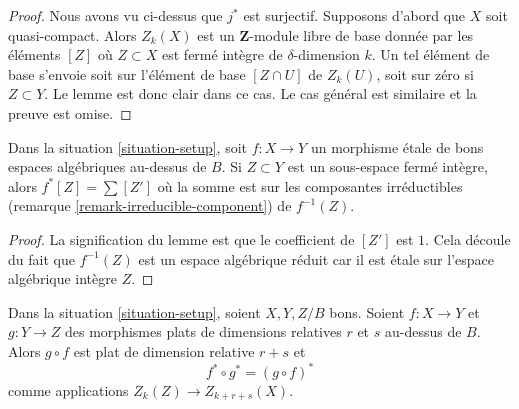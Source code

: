 \begin{proof}
Nous avons vu ci-dessus que $j^*$ est surjectif. Supposons d'abord que $X$
soit quasi-compact. Alors $Z_k(X)$ est un $\mathbf{Z}$-module libre de base
donnée par les éléments $[Z]$ où $Z \subset X$ est fermé intègre de
$\delta$-dimension $k$. Un tel élément de base s'envoie soit sur l'élément de
base $[Z \cap U]$ de $Z_k(U)$, soit sur zéro si $Z \subset Y$. Le lemme est donc
clair dans ce cas. Le cas général est similaire et la preuve est omise.
\end{proof}

\begin{lemma}
\label{lemma-etale-pullback}
Dans la situation \ref{situation-setup}, soit $f : X \to Y$ un morphisme
\'etale de bons espaces algébriques au-dessus de $B$. Si $Z \subset Y$ est un
sous-espace fermé intègre, alors $f^*[Z] = \sum [Z']$ où la somme est sur les
composantes irréductibles (remarque \ref{remark-irreducible-component}) de
$f^{-1}(Z)$.
\end{lemma}

\begin{proof}
La signification du lemme est que le coefficient de $[Z']$ est $1$. Cela
découle du fait que $f^{-1}(Z)$ est un espace algébrique réduit car il est
\'etale sur l'espace algébrique intègre $Z$.
\end{proof}

\begin{lemma}
\label{lemma-compose-flat-pullback}
Dans la situation \ref{situation-setup}, soient $X, Y, Z/B$ bons. Soient $f
: X \to Y$ et $g : Y \to Z$ des morphismes plats de dimensions relatives $r$
et $s$ au-dessus de $B$. Alors $g \circ f$ est plat de dimension relative $r + s$ et
$$
f^* \circ g^* = (g \circ f)^*
$$
comme applications $Z_k(Z) \to Z_{k + r + s}(X)$.
\end{lemma}

